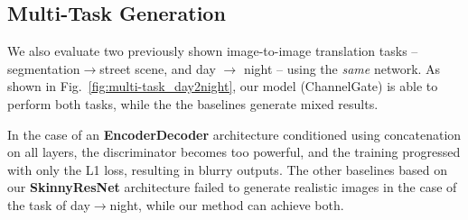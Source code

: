 \documentclass[10pt,twocolumn,letterpaper]{article}
\def\figref#1{Fig.~\ref{#1}}
\begin{document}
\vspace{-1mm}
\subsection{Multi-Task Generation}
We also evaluate two previously shown image-to-image translation tasks -- segmentation$\rightarrow$street scene, and day $\rightarrow$ night -- using the {\em same} network. 
As shown in \figref{fig:multi-task_day2night}, our model (ChannelGate) is able to perform both tasks, while the the baselines generate mixed results. 

In the case of an \textbf{EncoderDecoder} architecture \cite{huang2018multimodal} conditioned using concatenation on all layers, the discriminator becomes too powerful, and the training progressed with only the L1 loss, resulting in blurry outputs. The other baselines based on our \textbf{SkinnyResNet} architecture failed to generate realistic images in the case of the task of day$\rightarrow$night, while our method can achieve both.
\end{document}
